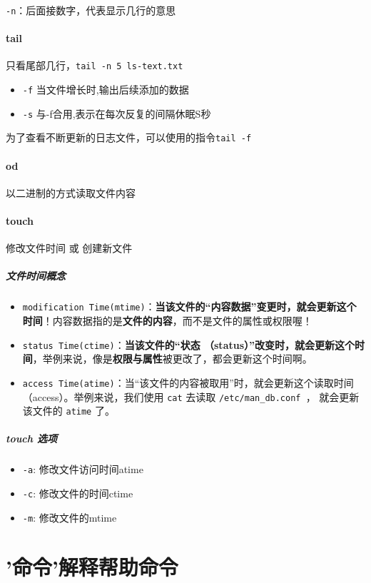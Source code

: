\documentclass[UTF8,a4paper,12pt]{ctexbook}
\begin{document}
				\verb|-n|：后面接数字，代表显示几行的意思
		\paragraph{tail} 只看尾部几行，\verb|tail -n 5 ls-text.txt|
				\begin{itemize}
					\item \verb|-f| 当文件增长时,输出后续添加的数据
					\item \verb|-s| 与-f合用,表示在每次反复的间隔休眠S秒
				\end{itemize}
			
				为了查看不断更新的日志文件，可以使用的指令\verb|tail -f|
		\paragraph{od} 以二进制的方式读取文件内容
			
		\paragraph{touch} 修改文件时间 或 创建新文件
			
			\subparagraph{文件时间概念}
				\begin{itemize}[itemindent = 1em]
					\item \verb|modification Time(mtime)|：\textbf{当该文件的“内容数据”变更时，就会更新这个时间}！内容数据指的是\textbf{文件的内容}，而不是文件的属性或权限喔！
					\item \verb|status Time(ctime)|：\textbf{当该文件的“状态 （status）”改变时，就会更新这个时间}，举例来说，像是\textbf{权限与属性}被更改了，都会更新这个时间啊。
					\item \verb|access Time(atime)|：当“该文件的内容被取用”时，就会更新这个读取时间 （access）。举例来说，我们使用 \verb|cat| 去读取 \verb|/etc/man_db.conf |， 就会更新该文件的 \verb|atime| 了。
				\end{itemize}
				
			\subparagraph{touch 选项}
				\begin{itemize}[itemindent = 1em]
					\item \verb|-a|: 修改文件访问时间atime
					\item \verb|-c|: 修改文件的时间ctime
					\item \verb|-m|: 修改文件的mtime
				\end{itemize}
				
	\section{'命令'解释帮助命令}
\end{document}
